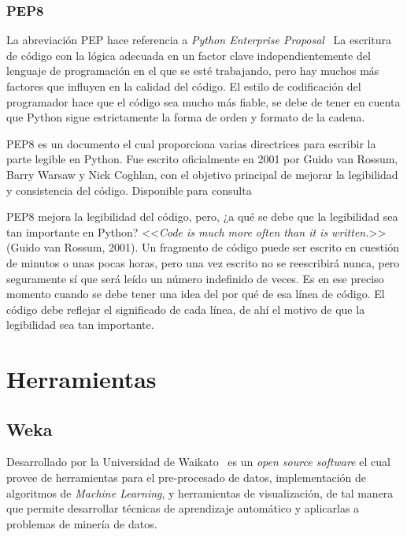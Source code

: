\subsubsection{PEP8}
La abreviación PEP hace referencia a \textit{Python Enterprise Proposal}~\cite{pep8javatpoint} La escritura de código con la lógica adecuada en un factor clave independientemente del lenguaje de programación en el que se esté trabajando, pero hay muchos más factores que influyen en la calidad del código. El estilo de codificación del programador hace que el código sea mucho más fiable, se debe de tener en cuenta que Python sigue estrictamente la forma de orden y formato de la cadena.

PEP8 es un documento el cual proporciona varias directrices para escribir la parte legible en Python. Fue escrito oficialmente en 2001 por Guido van Rossum, Barry Warsaw y Nick Coghlan, con el objetivo principal de mejorar la legibilidad y consistencia del código. Disponible para consulta~\cite{rossum_warsaw_coghlan}

PEP8 mejora la legibilidad del código, pero, ¿a qué se debe que la legibilidad sea tan importante en Python? <<\textit{Code is much more often than it is written.}>> (Guido van Rossum, 2001). Un fragmento de código puede ser escrito en cuestión de minutos o unas pocas horas, pero una vez escrito no se reescribirá nunca, pero seguramente sí que será leído un número indefinido de veces. Es en ese preciso momento cuando se debe tener una idea del por qué de esa línea de código. El código debe reflejar el significado de cada línea, de ahí el motivo de que la legibilidad sea tan importante.


\section{Herramientas}\label{sec:herramientas}
\subsection{Weka}\label{subsec:Weka}
Desarrollado por la Universidad de Waikato~\cite{witten2005practical} es un \textit{open source software} el cual provee de herramientas para el pre-procesado de datos, implementación de algoritmos de \textit{Machine Learning}, y herramientas de visualización, de tal manera que permite desarrollar técnicas de aprendizaje automático y aplicarlas a problemas de minería de datos. 

